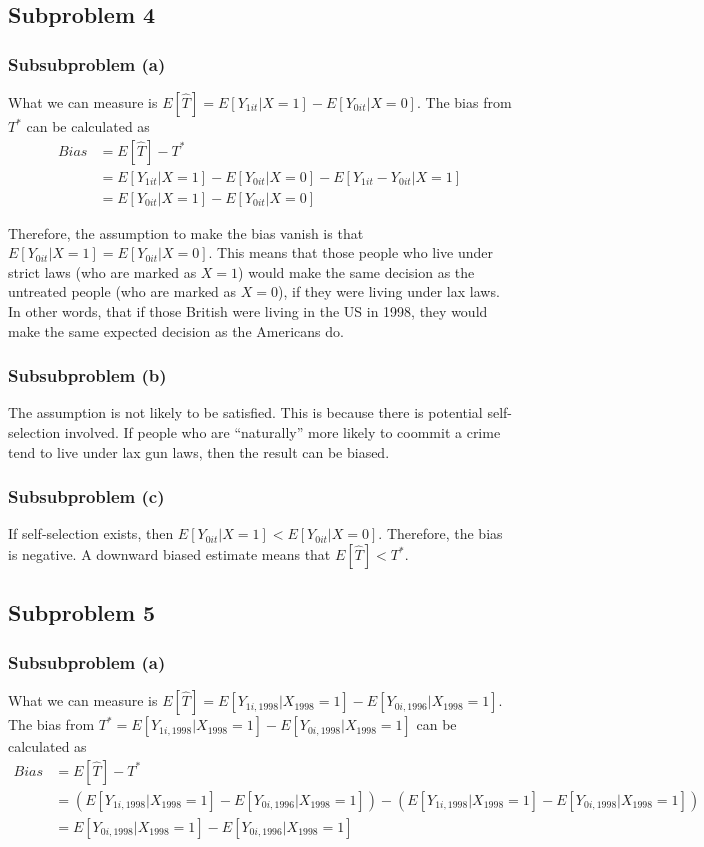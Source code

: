 \documentclass{article}
\begin{document}
\subsection{Subproblem 4}
\subsubsection{Subsubproblem (a)}
What we can measure is $E[\hat{T}]=E[Y_{1it}|X=1]-E[Y_{0it}|X=0]$. The bias from $T^*$ can be calculated as
\begin{align*}
	Bias&=E[\hat{T}]-T^*\\
	&=E[Y_{1it}|X=1]-E[Y_{0it}|X=0]-E[Y_{1it}-Y_{0it}|X=1]\\
	&=E[Y_{0it}|X=1]-E[Y_{0it}|X=0]
\end{align*}

Therefore, the assumption to make the bias vanish is that $E[Y_{0it}|X=1]=E[Y_{0it}|X=0]$. This means that those people who live under strict laws (who are marked as $X=1$) would make the same decision as the untreated people (who are marked as $X=0$), if they were living under lax laws. In other words, that if those British were living in the US in 1998, they would make the same expected decision as the Americans do.

\subsubsection{Subsubproblem (b)}
The assumption is not likely to be satisfied. This is because there is potential self-selection involved. If people who are ``naturally'' more likely to coommit a crime tend to live under lax gun laws, then the result can be biased.

\subsubsection{Subsubproblem (c)}
If self-selection exists, then $E[Y_{0it}|X=1]<E[Y_{0it}|X=0]$. Therefore, the bias is negative. A downward biased estimate means that $E[\hat{T}]<T^*$.

\subsection{Subproblem 5}
\subsubsection{Subsubproblem (a)}
What we can measure is $E[\hat{T}]=E[Y_{1i,1998}|X_{1998}=1]-E[Y_{0i,1996}|X_{1998}=1]$. The bias from $T^*=E[Y_{1i,1998}|X_{1998}=1]-E[Y_{0i,1998}|X_{1998}=1]$ can be calculated as
\begin{align*}
	Bias&=E[\hat{T}]-T^*\\
	&=(E[Y_{1i,1998}|X_{1998}=1]-E[Y_{0i,1996}|X_{1998}=1])-(E[Y_{1i,1998}|X_{1998}=1]-E[Y_{0i,1998}|X_{1998}=1])\\
	&=E[Y_{0i,1998}|X_{1998}=1]-E[Y_{0i,1996}|X_{1998}=1]\\
\end{align*}
\end{document}
